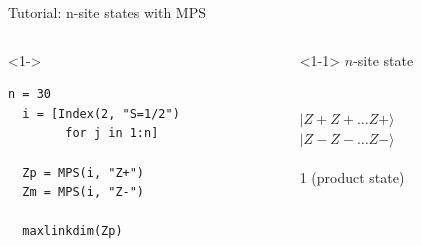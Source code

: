 \begin{frame}[fragile]{Tutorial: n-site states with MPS}

\begin{columns}

\begin{column}{4.5cm}

\begin{onlyenv}<1->
\begin{lstlisting}[language=JuliaLocal, style=julia, mathescape, basicstyle=\small]
  n = 30
  i = [Index(2, "S=1/2")
        for j in 1:n]

  Zp = MPS(i, "Z+")
  Zm = MPS(i, "Z-")

  maxlinkdim(Zp)
\end{lstlisting}
\end{onlyenv}

\end{column}

\begin{column}{5.5cm}

\begin{onlyenv}<1-1>
$n$-site state \\
~\\
~\\
$|Z+Z+\dots Z+\rangle$ \\
$|Z-Z-\dots Z-\rangle$ \\
~\\
1 (product state)
\end{onlyenv}


\end{column}
\end{columns}
\end{frame}
